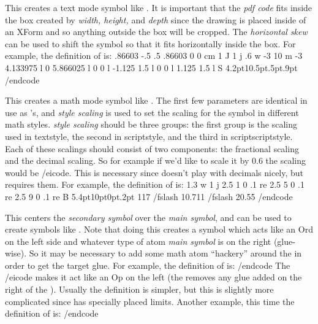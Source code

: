 This creates a text mode
symbol like \macroname\lightning.
It is important that the {\it pdf code} fits inside the box created by {\it width, height,\/} and {\it depth} since the
drawing is placed inside of an XForm and so anything outside the box will be cropped.
The {\it horizontal skew} can be used to shift the symbol so that it fits horizontally inside the box.
For example, the definition of \macroname\lightning{} is:
\begincode
{}       %
    {.86603 -.5 .5 .86603 0 0 cm    %
    1 J 1 j .6 w
    -3 10 m -3 4.133975 l 0 5.866025 l 0 0 l -1.125 1.5 l 0 0 l 1.125 1.5 l S}
    {4.2pt}{10.5pt}{.5pt}{.9pt}
/endcode
\emacroexp

 This creates a math
mode symbol like \macroname\divs.
The first few parameters are identical in use as \macroname\pdf@drawing@macro's, and {\it style scaling} is used to set the
scaling for the symbol in different math styles.
{\it style scaling} should be three groups: the first group is the scaling used in textstyle, the second in scriptstyle, and
the third in scriptscriptstyle.
Each of these scalings should consist of two components: the fractional scaling and the decimal scaling.
So for example if we'd like to scale it by $0.6$ the scaling would be /eicode.
This is necessary since \macroname\dimexpr{} doesn't play with decimals nicely, but \macroname\pdfliteral{} requires them.
For example, the definition of \macroname\divs{} is:
\begincode
{}
    {1.3 w 1 j
    2.5 1 0 .1 re
    2.5 5 0 .1 re
    2.5 9 0 .1 re B}
    {5.4pt}{10pt}{0pt}{.2pt}
    {{1}{1}}{{7 /fslash 10}{.7}}{{11 /fslash 20}{.55}}
\def\divs{\mathrel{\@divs}}     %
/endcode
\emacroexp

 This centers the {\it secondary symbol} over the {\it main symbol}, and
can be used to create symbols like \macroname\aint.
Note that doing this creates a symbol which acts like an Ord on the left side and whatever type of atom {\it main symbol} is
on the right (glue-wise).
So it may be necessary to add some math atom ``hackery'' around the \macroname\putsym{} in order to get the target glue.
For example, the definition of \macroname\aint{} is:
\begincode
\def\aint{\mathop{}\mathclose{}\putsym\int-}
/endcode
The \icode \mathop{}\mathclose{}/eicode{} makes it act like an Op on the left (the \macroname\mathclose{} removes any glue
added on the right of the \macroname\mathop).
Usually the definition is simpler, but this is slightly more complicated since \macroname\int{} has specially placed limits.
Another example, this time the definition of \macroname\bigdcup{} is:
\begincode
\def\bigdcup{\mathop{\putsym\bigcup\cdot}}
/endcode
\emacroexp

